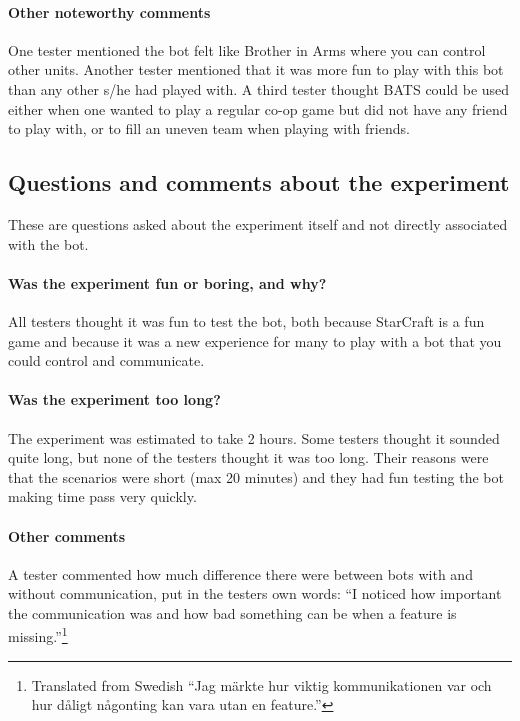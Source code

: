 \paragraph{Other noteworthy comments}
One tester mentioned the bot felt like Brother in Arms where you can control other units. Another
tester mentioned that it was more fun to play with this bot than any other s/he had played with. A
third tester thought BATS could be used either when one wanted to play a regular co-op game but did
not have any friend to play with, or to fill an uneven team when playing with friends.

\subsection{Questions and comments about the experiment}
These are questions asked about the experiment itself and not directly associated with the bot.

\paragraph{Was the experiment fun or boring, and why?}
All testers thought it was fun to test the bot, both because StarCraft is a fun game and because it
was a new experience for many to play with a bot that you could control and communicate.

\paragraph{Was the experiment too long?}
The experiment was estimated to take 2 hours. Some testers thought it sounded quite long, but none
of the testers thought it was too long. Their reasons were that the scenarios were short (max 20
minutes) and they had fun testing the bot making time pass very quickly.

\paragraph{Other comments}
A tester commented how much difference there were between bots with and without communication, put
in the testers own words: ``I noticed how important the communication was and how bad something can
be when a feature is missing.''\footnote{Translated from Swedish ``Jag märkte hur viktig
kommunikationen var och hur dåligt någonting kan vara utan en feature.''}
